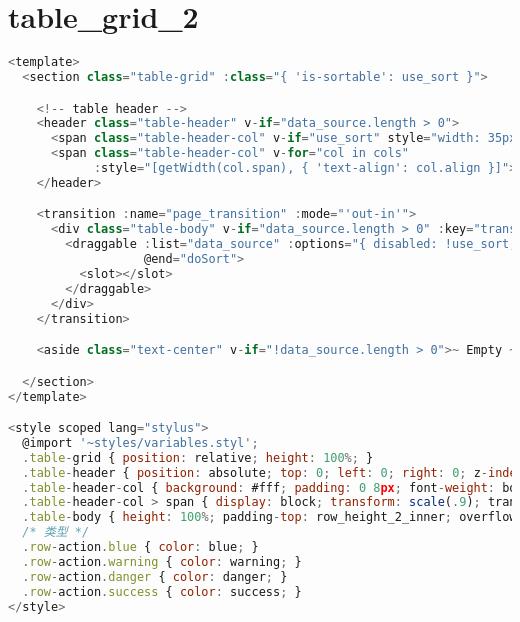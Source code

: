 \chapter{table\_grid\_2}


\begin{lstlisting}[language=JavaScript]
<template>
  <section class="table-grid" :class="{ 'is-sortable': use_sort }">

    <!-- table header -->
    <header class="table-header" v-if="data_source.length > 0">
      <span class="table-header-col" v-if="use_sort" style="width: 35px;"><span>排序</span></span>
      <span class="table-header-col" v-for="col in cols"
            :style="[getWidth(col.span), { 'text-align': col.align }]"><span v-html="col.col_title"></span></span>
    </header>

    <transition :name="page_transition" :mode="'out-in'">
      <div class="table-body" v-if="data_source.length > 0" :key="transition_key">
        <draggable :list="data_source" :options="{ disabled: !use_sort, animation: 150, handle: '.drag-handle' }"
                   @end="doSort">
          <slot></slot>
        </draggable>
      </div>
    </transition>

    <aside class="text-center" v-if="!data_source.length > 0">~ Empty ~</aside>

  </section>
</template>

<style scoped lang="stylus">
  @import '~styles/variables.styl';
  .table-grid { position: relative; height: 100%; }
  .table-header { position: absolute; top: 0; left: 0; right: 0; z-index: 100; display: flex; line-height: row_height_2_inner; white-space: nowrap; box-shadow: 0 1px 2px -1px rgba(0, 0, 0, .3); }
  .table-header-col { background: #fff; padding: 0 8px; font-weight: bold; }
  .table-header-col > span { display: block; transform: scale(.9); transform-origin: 0 100%; }
  .table-body { height: 100%; padding-top: row_height_2_inner; overflow-y: auto; }
  /* 类型 */
  .row-action.blue { color: blue; }
  .row-action.warning { color: warning; }
  .row-action.danger { color: danger; }
  .row-action.success { color: success; }
</style>


\end{lstlisting}
